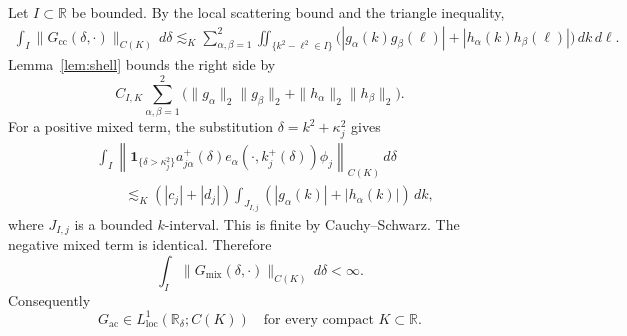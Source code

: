 \documentclass[11pt]{amsart}
\numberwithin{equation}{section}
\theoremstyle{remark}
\newcommand{\R}{\mathbb R}
\newcommand{\ac}{\mathrm{ac}}
\begin{document}
Let $I\subset\R$ be bounded.  By the local scattering bound and the triangle
inequality,
\begin{align*}
 \int_I\|G_{\mathrm{cc}}(\delta,\cdot)\|_{C(K)}\,d\delta
 \lesssim_K\sum_{\alpha,\beta=1}^2
 \iint_{\{k^2-\ell^2\in I\}}
 \bigl(|g_\alpha(k)g_\beta(\ell)|
      +|h_\alpha(k)h_\beta(\ell)|\bigr)\,dk\,d\ell.
\end{align*}
Lemma~\ref{lem:shell} bounds the right side by
\[
 C_{I,K}\sum_{\alpha,\beta=1}^2
 \bigl(\|g_\alpha\|_2\|g_\beta\|_2
       +\|h_\alpha\|_2\|h_\beta\|_2\bigr).
\]
For a positive mixed term, the substitution
$\delta=k^2+\kappa_j^2$ gives
\begin{align*}
 &\int_I\left\|
 \mathbf1_{\{\delta>\kappa_j^2\}}a^+_{j\alpha}(\delta)
 e_\alpha(\cdot,k_j^+(\delta))\phi_j
 \right\|_{C(K)}\,d\delta\\
 &\qquad\lesssim_K (|c_j|+|d_j|)
 \int_{J_{I,j}}(|g_\alpha(k)|+|h_\alpha(k)|)\,dk,
\end{align*}
where $J_{I,j}$ is a bounded $k$-interval.  This is finite by
Cauchy--Schwarz.  The negative mixed term is identical.  Therefore
\[
 \int_I\|G_{\mathrm{mix}}(\delta,\cdot)\|_{C(K)}\,d\delta<\infty.
\]
Consequently
\begin{equation}
 G_{\ac}\in L^1_{\mathrm{loc}}(\R_\delta;C(K))
 \quad\text{for every compact }K\subset\R.
 \label{eq:C-K-valued-density}
\end{equation}
\end{document}
